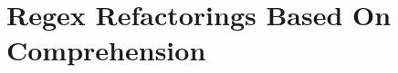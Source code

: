 \section{Regex Refactorings Based On Comprehension}
\label{sec:comprehensionRefactorings}





% 




